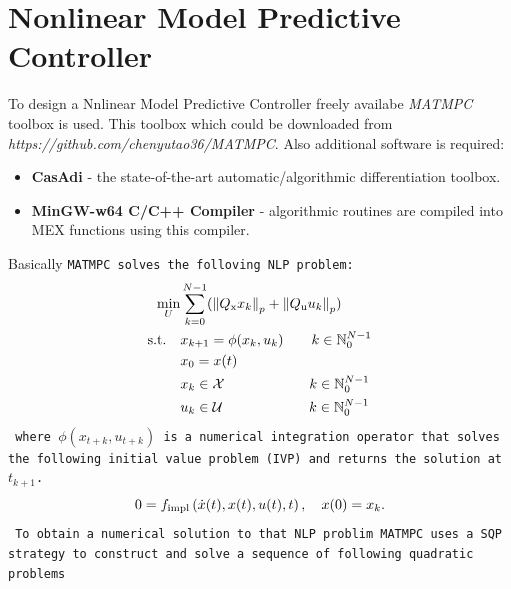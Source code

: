 \section{Nonlinear Model Predictive Controller}
To design a Nnlinear Model Predictive Controller freely availabe \textit{MATMPC} toolbox is used. This toolbox which could be downloaded from \textit{https://github.com/chenyutao36/MATMPC}. Also additional software is required:
\begin{itemize}
	\item \textbf{CasAdi} - the state-of-the-art automatic/algorithmic differentiation toolbox.
	\item \textbf{MinGW-w64 C/C++ Compiler} - algorithmic routines are compiled
	into MEX functions using this compiler.
\end{itemize}
Basically \tt{MATMPC} solves the folloving NLP problem:
\begin{subequations}\label{NLP}
	\begin{align}
	\min_{U} &\sum_{k=0}^{N-1} (\left\| Q _{\text{x}}x_{k}\right\|_p+\left\|Q _{\text{u}}u_{k}\right\|_p)\\
	\text{s.t.}\quad&x_{k+1} = \phi(x_{k},u_{k})\qquad k \in \mathbb{N}_0^{N-1}\\
	&x_0 = x(t)\\
	&x_{k}\in\mathcal{X}\qquad\qquad\qquad\!\: k \in \mathbb{N}_0^{N-1}\\
	&u_{k}\in\mathcal{U}\qquad\qquad\qquad\, k \in \mathbb{N}_0^{N-1}
	\end{align}
\end{subequations}
where $\phi(x_{t+k},u_{t+k})$ is a numerical integration operator that solves the following initial value problem (IVP) and returns the solution at $t_{k+1}$.
\begin{equation}
0=f _{\text{impl}}\left( \dot{x}(t), x(t),u(t),t \right),\quad x(0)=x_k.
\end{equation}
To obtain a numerical solution to that NLP problim \tt{MATMPC} uses a SQP strategy to construct and solve a sequence of following quadratic problems

